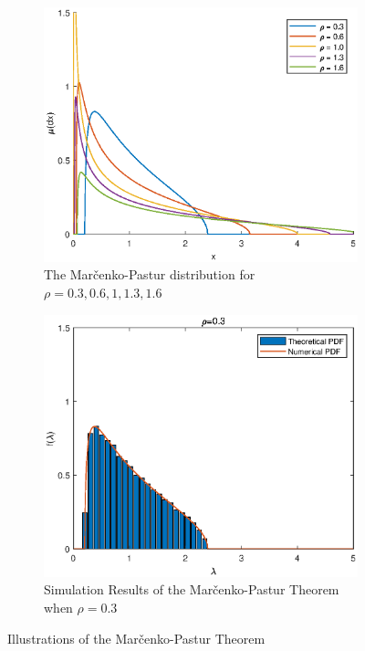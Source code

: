 \begin{figure}[htbp]
    \centering
    \begin{subfigure}{.45\linewidth}
        \includegraphics[width=\textwidth]{random-matrix-theory/figures/marchenko-pastur-distribution.eps}
        \caption{The Marčenko-Pastur distribution for $\rho=0.3,0.6,1,1.3,1.6$}
    \end{subfigure}
    \begin{subfigure}{.45\linewidth}
        \includegraphics[width=\textwidth]{random-matrix-theory/figures/marchenko-pastur-theorem-simulation.eps}
        \caption{Simulation Results of the Marčenko-Pastur Theorem when $\rho=0.3$}
    \end{subfigure}
    \caption{Illustrations of the Marčenko-Pastur Theorem}
\end{figure}

